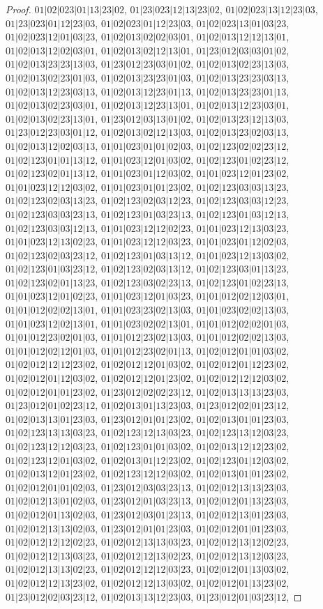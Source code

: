 \documentclass[12pt]{article}
\theoremstyle{plain}
\theoremstyle{definition}
\theoremstyle{remark}
\begin{document}
\begin{proof}
$01|02|023|01|13|23|02$, $01|23|023|12|13|23|02$, $01|02|023|13|12|23|03$, $01|23|023|01|12|23|03$, $01|02|023|01|12|23|03$, $01|02|023|13|01|03|23$, $01|02|023|12|01|03|23$, $01|02|013|02|02|03|01$, $01|02|013|12|12|13|01$, $01|02|013|12|02|03|01$, $01|02|013|02|12|13|01$, $01|23|012|03|03|01|02$, $01|02|013|23|23|13|03$, $01|23|012|23|03|01|02$, $01|02|013|02|23|13|03$, $01|02|013|02|23|01|03$, $01|02|013|23|23|01|03$, $01|02|013|23|23|03|13$, $01|02|013|12|23|03|13$, $01|02|013|12|23|01|13$, $01|02|013|23|23|01|13$, $01|02|013|02|23|03|01$, $01|02|013|12|23|13|01$, $01|02|013|12|23|03|01$, $01|02|013|02|23|13|01$, $01|23|012|03|13|01|02$, $01|02|013|23|12|13|03$, $01|23|012|23|03|01|12$, $01|02|013|02|12|13|03$, $01|02|013|23|02|03|13$, $01|02|013|12|02|03|13$, $01|01|023|01|01|02|03$, $01|02|123|02|02|23|12$, $01|02|123|01|01|13|12$, $01|01|023|12|01|03|02$, $01|02|123|01|02|23|12$, $01|02|123|02|01|13|12$, $01|01|023|01|12|03|02$, $01|01|023|12|01|23|02$, $01|01|023|12|12|03|02$, $01|01|023|01|01|23|02$, $01|02|123|03|03|13|23$, $01|02|123|02|03|13|23$, $01|02|123|02|03|12|23$, $01|02|123|03|03|12|23$, $01|02|123|03|03|23|13$, $01|02|123|01|03|23|13$, $01|02|123|01|03|12|13$, $01|02|123|03|03|12|13$, $01|01|023|12|12|02|23$, $01|01|023|12|13|03|23$, $01|01|023|12|13|02|23$, $01|01|023|12|12|03|23$, $01|01|023|01|12|02|03$, $01|02|123|02|03|23|12$, $01|02|123|01|03|13|12$, $01|01|023|12|13|03|02$, $01|02|123|01|03|23|12$, $01|02|123|02|03|13|12$, $01|02|123|03|01|13|23$, $01|02|123|02|01|13|23$, $01|02|123|03|02|23|13$, $01|02|123|01|02|23|13$, $01|01|023|12|01|02|23$, $01|01|023|12|01|03|23$, $01|01|012|02|12|03|01$, $01|01|012|02|02|13|01$, $01|01|023|23|02|13|03$, $01|01|023|02|02|13|03$, $01|01|023|12|02|13|01$, $01|01|023|02|02|13|01$, $01|01|012|02|02|01|03$, $01|01|012|23|02|01|03$, $01|01|012|23|02|13|03$, $01|01|012|02|02|13|03$, $01|01|012|02|12|01|03$, $01|01|012|23|02|01|13$, $01|02|012|01|01|03|02$, $01|02|012|12|12|23|02$, $01|02|012|12|01|03|02$, $01|02|012|01|12|23|02$, $01|02|012|01|12|03|02$, $01|02|012|12|01|23|02$, $01|02|012|12|12|03|02$, $01|02|012|01|01|23|02$, $01|23|012|02|02|23|12$, $01|02|013|13|13|23|03$, $01|23|012|01|02|23|12$, $01|02|013|01|13|23|03$, $01|23|012|02|01|23|12$, $01|02|013|13|01|23|03$, $01|23|012|01|01|23|02$, $01|02|013|01|01|23|03$, $01|02|123|13|13|03|23$, $01|02|123|12|13|03|23$, $01|02|123|13|12|03|23$, $01|02|123|12|12|03|23$, $01|02|123|01|01|03|02$, $01|02|013|12|12|23|02$, $01|02|123|12|01|03|02$, $01|02|013|01|12|23|02$, $01|02|123|01|12|03|02$, $01|02|013|12|01|23|02$, $01|02|123|12|12|03|02$, $01|02|013|01|01|23|02$, $01|02|012|01|01|02|03$, $01|23|012|03|03|23|13$, $01|02|012|13|13|23|03$, $01|02|012|13|01|02|03$, $01|23|012|01|03|23|13$, $01|02|012|01|13|23|03$, $01|02|012|01|13|02|03$, $01|23|012|03|01|23|13$, $01|02|012|13|01|23|03$, $01|02|012|13|13|02|03$, $01|23|012|01|01|23|03$, $01|02|012|01|01|23|03$, $01|02|012|12|12|02|23$, $01|02|012|13|13|03|23$, $01|02|012|13|12|02|23$, $01|02|012|12|13|03|23$, $01|02|012|12|13|02|23$, $01|02|012|13|12|03|23$, $01|02|012|13|13|02|23$, $01|02|012|12|12|03|23$, $01|02|012|01|13|03|02$, $01|02|012|12|13|23|02$, $01|02|012|12|13|03|02$, $01|02|012|01|13|23|02$, $01|23|012|02|03|23|12$, $01|02|013|13|12|23|03$, $01|23|012|01|03|23|12$, 
\end{proof}
\end{document}
